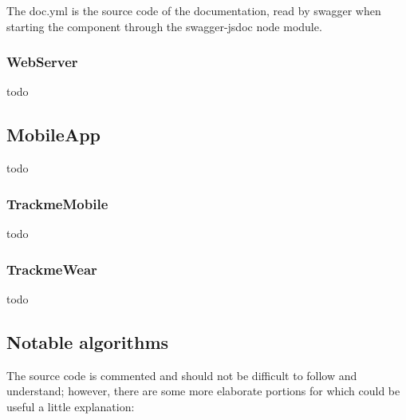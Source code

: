 \documentclass[../main.tex]{subfiles}
\begin{document}
The doc.yml is the source code of the documentation, read by swagger when starting the component through the swagger-jsdoc node module.

\subsubsection{WebServer}

todo

\subsection{MobileApp}

todo

\subsubsection{TrackmeMobile}

todo

\subsubsection{TrackmeWear}

todo

\subsection{Notable algorithms}

The source code is commented and should not be difficult to follow and understand; however, there are some more elaborate portions for which could be useful a little explanation:
\end{document}
